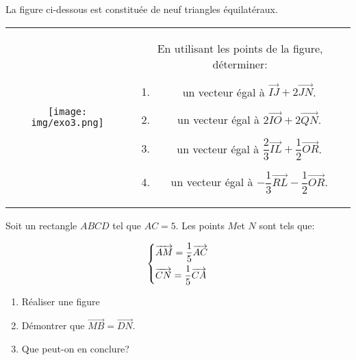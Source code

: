 \documentclass[a4paper]{article}
\begin{document}
  \pagebreak
  
  \begin{exercice}{}{}
    La figure ci-dessous est constituée de neuf triangles équilatéraux.
  
    \begin{tabular}{cc}
      \begin{minipage}{7cm}
  
        \begin{center}
          \texttt{[image: img/exo3.png]}
          \end{center}
      \end{minipage}&
      \begin{minipage}{10cm}
  
        En utilisant les points de la figure, déterminer:
        \begin{enumerate}
          \item un vecteur égal à $\overrightarrow{IJ}+2\overrightarrow{JN}$.
          \item un vecteur égal à $2\overrightarrow{IO}+2\overrightarrow{QN}$.
          \item un vecteur égal à $\dfrac{2}{3}\overrightarrow{IL}+\dfrac{1}{2}\overrightarrow{OR}$.
          \item un vecteur égal à $-\dfrac{1}{3}\overrightarrow{RL}-\dfrac{1}{2}\overrightarrow{OR}$.
        \end{enumerate}
      \end{minipage}\\
    \end{tabular}
  \end{exercice}
  
  \medskip
  \begin{exercice}{}{}
  
      Soit un rectangle $ABCD$ tel que $AC = 5$. Les points $M$et $N$ sont tels que:
   
   $$\begin{dcases}
    \overrightarrow{AM}=\dfrac{1}{5}\overrightarrow{AC}\\
    \overrightarrow{CN}=\dfrac{1}{5}\overrightarrow{CA}
   \end{dcases}$$
   \begin{enumerate}
       \item Réaliser une figure
       \item Démontrer que $\overrightarrow{MB}=\overrightarrow{DN}$.
       \item Que peut-on en conclure?
   \end{enumerate}
  
      
  \end{exercice}
  \medskip
  
\end{document}
